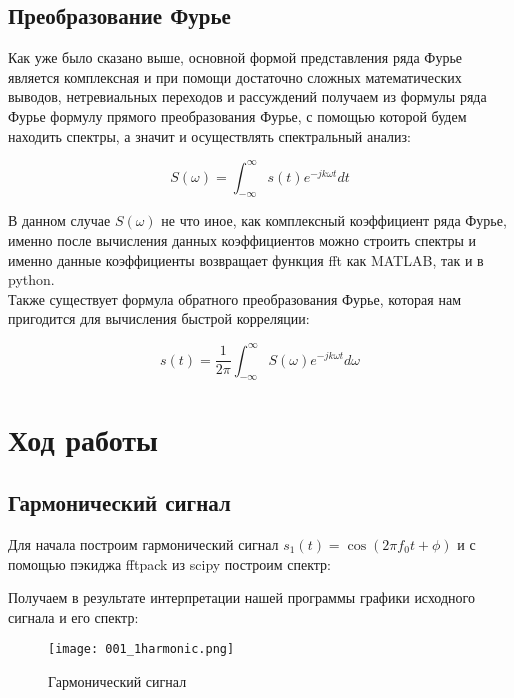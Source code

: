 \begin{itemize}
\subsection{ Преобразование Фурье}

Как уже было сказано выше, основной формой представления ряда Фурье является комплексная
и при помощи достаточно сложных математических выводов, нетревиальных переходов и рассуждений получаем из формулы ряда Фурье формулу прямого преобразования Фурье, с помощью которой будем находить спектры, а значит и осуществлять спектральный анализ:

$$ S(\omega ) = \int_{-\infty}^{\infty} s(t)e^{-jk \omega t} dt $$

\noindent В данном случае $ S(\omega ) $ не что иное, как комплексный коэффициент ряда Фурье, именно после вычисления данных коэффициентов можно строить спектры и именно данные коэффициенты возвращает функция fft как MATLAB, так и в python. \\  
Также существует формула обратного преобразования Фурье, которая нам пригодится для вычисления быстрой корреляции:

$$ s(t) = \frac{1}{2 \pi} \int_{-\infty}^{\infty} S(\omega)e^{-jk \omega t} d \omega $$

    
\end{itemize}
 


\section{Ход работы}

\subsection{Гармонический сигнал}
Для начала построим гармонический сигнал $s_1(t) = \cos(2\pi f_0t +\phi)$
и с помощью пэкиджа fftpack из scipy построим спектр:

\parindent=1cm %

Получаем в результате интерпретации нашей программы графики исходного сигнала и
его спектр:

\begin{figure}[H]
	\begin{center}
		\texttt{[image: 001\_1harmonic.png]}
		\caption{Гармонический сигнал} 
		\label{pic:pic01} %
	\end{center}
\end{figure} 

